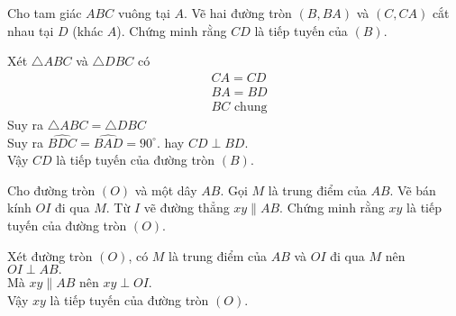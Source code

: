 \begin{bt}
Cho tam giác $ABC$ vuông tại $A$. Vẽ hai đường tròn $(B,BA)$ và $(C,CA)$ cắt nhau tại $D$ (khác $A$). Chứng minh rằng $CD$ là tiếp tuyến của $(B)$.
\loigiai
{
\immini
{
Xét $\triangle ABC$ và $\triangle DBC$ có
\begin{eqnarray*}
&CA=CD\\
&BA=BD\\
&BC \text{ chung}
\end{eqnarray*}
Suy ra $\triangle ABC = \triangle DBC$\\
Suy ra $\widehat{BDC}=\widehat{BAD}=90^{\circ}.$ hay $CD \perp BD.$\\
Vậy $CD$ là tiếp tuyến của đường tròn $(B)$.
}
{
}
}
\end{bt}
 
\begin{bt}
Cho đường tròn $(O)$ và một dây $AB$. Gọi $M$ là trung điểm của $AB$. Vẽ bán kính $OI$ đi qua $M$. Từ $I$ vẽ đường thẳng $xy \parallel AB.$ Chứng minh rằng $xy$ là tiếp tuyến của đường tròn $(O)$.
\loigiai
{
\immini
{
Xét đường tròn $(O)$, có $M$ là trung điểm của $AB$ và $OI$ đi qua $M$ nên $OI \perp AB.$\\
Mà $xy \parallel AB$ nên $xy \perp OI.$\\
Vậy $xy$ là tiếp tuyến của đường tròn $(O)$.
}
{
}
}
\end{bt}
  
